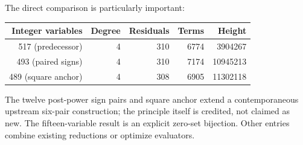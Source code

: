 The direct comparison is particularly important:
\begin{center}
\begin{tabular}{@{}rrrrr@{}}
\toprule
Integer variables & Degree & Residuals & Terms & Height\\
\midrule
517 (predecessor)&4&310&6774&3904267\\
493 (paired signs)&4&310&7174&10945213\\
489 (square anchor)&4&308&6905&11302118\\
\bottomrule
\end{tabular}
\end{center}
The twelve post-power sign pairs and square anchor extend a contemporaneous
upstream six-pair construction; the principle itself is credited, not
claimed as new. The fifteen-variable result is an explicit zero-set
bijection. Other entries combine existing reductions or optimize evaluators.
